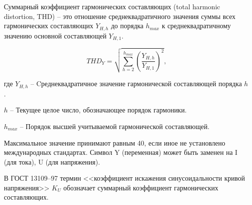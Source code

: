 Суммарный коэффициент гармонических составляющих (total harmonic distortion, THD) -- это отношение среднеквадратичного значения суммы всех гармонических составляющих $Y_{H,h}$ до порядка $h_{max}$ к среднеквадратичному значению основной составляющей $Y_{H,1}$.

\begin{equation}
\label{eq:$THD_Y$}
THD_Y = \sqrt{\sum_{h=2}^{h_{max}}\left( \frac{Y_{H,h}}{Y_{H,1}}\right) ^2},
\end{equation}

где ${Y_{H,h}}$ -- Cреднеквадратичное значение гармонической составляющей порядка $h$.

$h$ -- Текущее целое число, обозначающее порядок гармоники.

${h_{max}}$ -- Порядок высшей учитываемой гармонической составляющей.  

Максимальное значение принимают равным 40, если иное не установлено международных стандартах. Символ Y (переменная) может быть заменен на I (для тока), U (для напряжения). 

В ГОСТ 13109--97 термин <<коэффициент искажения синусоидальности кривой напряжения>> $K_U$ обозначает суммарный коэффициент гармонических составляющих.


